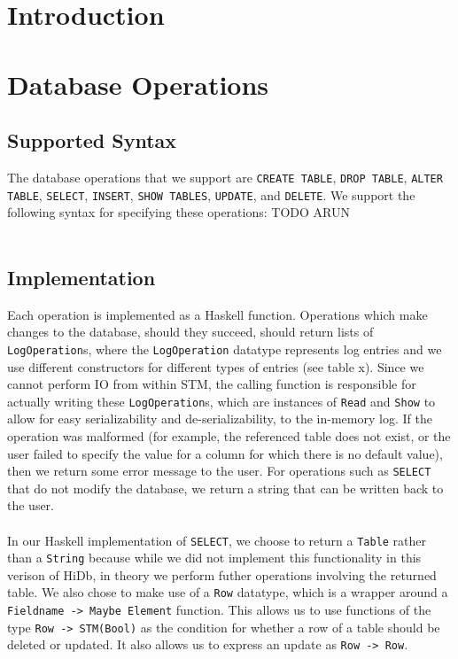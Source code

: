 \documentclass[10.75pt]{article}
\begin{document}
\vspace{5mm}
\begin{multicols}{2}

\section{Introduction} 

\section{Database Operations}
\subsection{Supported Syntax}
The database operations that we support are \texttt{CREATE TABLE}, \texttt{DROP TABLE}, \texttt{ALTER TABLE}, \texttt{SELECT}, \texttt{INSERT}, \texttt{SHOW TABLES}, \texttt{UPDATE}, and \texttt{DELETE}.  We support the following syntax for specifying these operations:
TODO ARUN \\\\
\subsection{Implementation}
Each operation is implemented as a Haskell function.  Operations which make changes to the database, should they succeed, should return lists of \texttt{LogOperation}s, where the \texttt{LogOperation} datatype represents log entries and we use different constructors for different types of entries (see table x). Since we cannot perform IO from within STM, the calling function is responsible for actually writing these \texttt{LogOperation}s, which are instances of \texttt{Read} and \texttt{Show} to allow for easy serializability and de-serializability, to the in-memory log. If the operation was malformed (for example, the referenced table does not exist, or the user failed to specify the value for a column for which there is no default value), then we return some error message to the user. For operations such as \texttt{SELECT} that do not modify the database, we return a string that can be written back to the user. \\\\
In our Haskell implementation of \texttt{SELECT}, we choose to return a \texttt{Table} rather than a \texttt{String} because while we did not implement this functionality in this verison of HiDb, in theory we perform futher operations involving the returned table. We also chose to make use of a \texttt{Row} datatype, which is a wrapper around a \texttt{Fieldname -> Maybe Element} function. This allows us to use functions of the type \texttt{Row -> STM(Bool)} as the condition for whether a row of a table should be deleted or updated. It also allows us to express an update as \texttt{Row -> Row}. 


\end{multicols}
\end{document}
